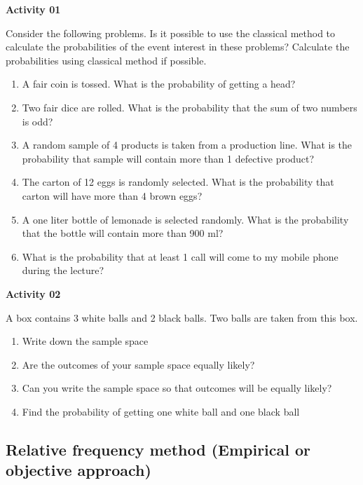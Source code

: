 \documentclass[]{book}
\begin{document}
\textbf{Activity 01}

Consider the following problems. Is it possible to use the classical method to calculate the probabilities of the event interest in these problems? Calculate the probabilities using classical method if possible.

\begin{enumerate}
\def\labelenumi{(\alph{enumi})}
\item
  A fair coin is tossed. What is the probability of getting a head?
\item
  Two fair dice are rolled. What is the probability that the sum of two numbers is odd?
\item
  A random sample of 4 products is taken from a production line. What is the probability that sample will contain more than 1 defective product?
\item
  The carton of 12 eggs is randomly selected. What is the probability that carton will have more than 4 brown eggs?
\item
  A one liter bottle of lemonade is selected randomly. What is the probability that the bottle will contain more than 900 ml?
\item
  What is the probability that at least 1 call will come to my mobile phone during the lecture?
\end{enumerate}

\textbf{Activity 02}

A box contains 3 white balls and 2 black balls. Two balls are taken from this box.

\begin{enumerate}
\def\labelenumi{(\alph{enumi})}
\item
  Write down the sample space
\item
  Are the outcomes of your sample space equally likely?
\item
  Can you write the sample space so that outcomes will be equally likely?
\item
  Find the probability of getting one white ball and one black ball
\end{enumerate}

\hypertarget{relative-frequency-method-empirical-or-objective-approach}{%
\subsection{Relative frequency method (Empirical or objective approach)}\label{relative-frequency-method-empirical-or-objective-approach}}
\end{document}
